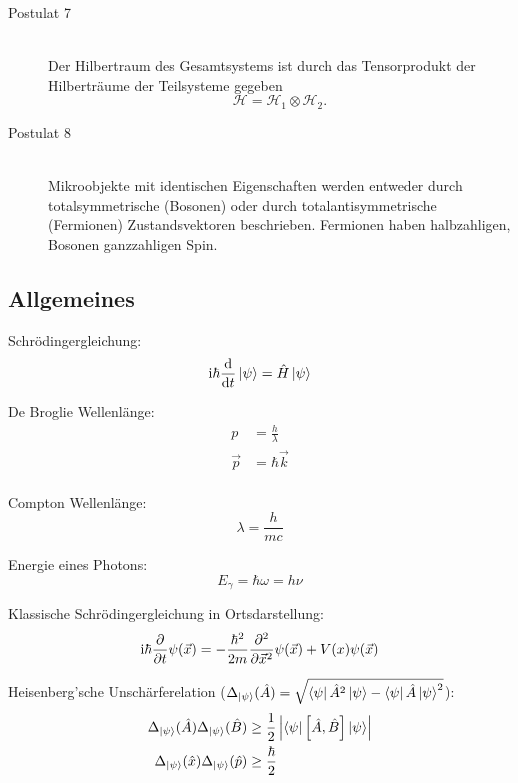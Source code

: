 \begin{description}
			\item[Postulat 7]\hfill \\
				Der Hilbertraum des Gesamtsystems ist durch das Tensorprodukt der Hilberträume der Teilsysteme gegeben
				\begin{equation}
					\mathcal{H} = \mathcal{H}_1 \otimes \mathcal{H}_2.
				\end{equation}
			\item[Postulat 8]\hfill \\
				Mikroobjekte mit identischen Eigenschaften werden entweder durch totalsymmetrische (Bosonen) oder durch totalantisymmetrische (Fermionen) Zustandsvektoren beschrieben. Fermionen haben halbzahligen, Bosonen ganzzahligen Spin.
		\end{description}

	\subsection{Allgemeines}
		\noindent
		Schrödingergleichung:
		\begin{equation}
			\mathrm{i}\hbar\frac{\mathrm{d} }{\mathrm{d} t}\Ket{\psi} = \hat{H}\Ket{\psi}
		\end{equation}

		\noindent
		De Broglie Wellenlänge:
		\begin{equation}
			\begin{aligned}
				p &= \frac{h}{\lambda} \\
				\vec{p} &= \hbar \vec{k} \\
			\end{aligned}
		\end{equation}

		\noindent
		Compton Wellenlänge:
		\begin{equation}
			\lambda = \frac{h}{mc}
		\end{equation}

		\noindent
		Energie eines Photons:
		\begin{equation}
			E_\gamma = \hbar\omega = h\nu
		\end{equation}

		\noindent
		Klassische Schrödingergleichung in Ortsdarstellung:
		\begin{equation}
			\mathrm{i}\hbar\frac{\partial }{\partial t}\psi(\vec{x}) = -\frac{\hbar^2}{2m}\frac{\partial^2}{\partial \vec{x}^2}\psi(\vec{x}) + V(x)\psi(\vec{x})
		\end{equation}

		\noindent
		Heisenberg'sche Unschärferelation ($\Delta_{\Ket{\psi}} (\hat{A}) = \sqrt{\Bra{\psi}\hat{A}^2\Ket{\psi} - \Bra{\psi}\hat{A}\Ket{\psi}^2}$):
		\begin{equation}
			\begin{aligned}
				\Delta_{\Ket{\psi}}(\hat{A}) \Delta_{\Ket{\psi}}(\hat{B}) &\ge
				\frac{1}{2} \left|\Bra{\psi} \left[\hat{A},\hat{B}\right] \Ket{\psi}\right| \\
				\Delta_{\Ket{\psi}}(\hat{x}) \Delta_{\Ket{\psi}}(\hat{p}) &\ge
				\frac{\hbar}{2}
			\end{aligned}
		\end{equation}

